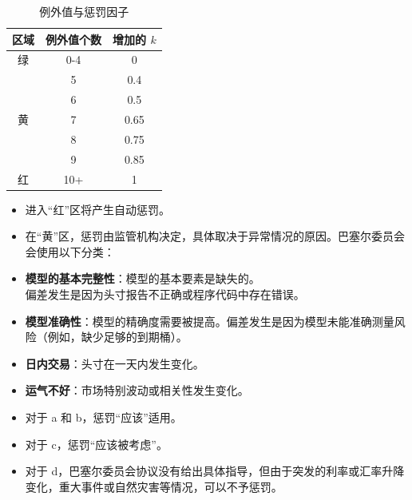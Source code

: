 \begin{table}[h]
    \centering
    
    \begin{tabular}{|c|c|c|}
        \hline
        区域 & 例外值个数 & 增加的 \( k \) \\
        \hline
        绿 & 0-4 & 0 \\
        \hline
        \multirow{5}{*}{黄} & 5 & 0.4 \\
        \cline{2-3}
        &6 & 0.5 \\
        \cline{2-3}
        & 7 & 0.65 \\
        \cline{2-3}
        & 8 & 0.75 \\
        \cline{2-3}
        & 9 & 0.85 \\
        \hline
        红 & 10+ & 1 \\
        \hline
    \end{tabular}
    \caption{例外值与惩罚因子}
\end{table}

\begin{itemize}
    \item 进入“红”区将产生自动惩罚。
    \item 在“黄”区，惩罚由监管机构决定，具体取决于异常情况的原因。巴塞尔委员会会使用以下分类：
\end{itemize}

\begin{itemize}
    \item \textbf{模型的基本完整性}：模型的基本要素是缺失的。\\
    偏差发生是因为头寸报告不正确或程序代码中存在错误。
    \item \textbf{模型准确性}：模型的精确度需要被提高。偏差发生是因为模型未能准确测量风险（例如，缺少足够的到期桶）。
    \item \textbf{日内交易}：头寸在一天内发生变化。
    \item \textbf{运气不好}：市场特别波动或相关性发生变化。
\end{itemize}

\begin{itemize}
    \item 对于 a 和 b，惩罚“应该”适用。
    \item 对于 c，惩罚“应该被考虑”。
    \item 对于 d，巴塞尔委员会协议没有给出具体指导，但由于突发的利率或汇率升降变化，重大事件或自然灾害等情况，可以不予惩罚。
\end{itemize}



